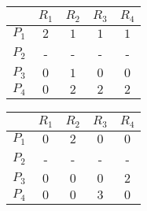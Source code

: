 \begin{example}
	\begin{table}[!h]
		\centering
		\begin{tabular}{|c|c|c|c|c|}
			\hline
			& \textbf{$R_1$} & \textbf{$R_2$} & \textbf{$R_3$} & \textbf{$R_4$} \\
			\hline
			\textbf{$P_1$} & $2$ & $1$ & $1$ & $1$ \\
			\hline
			\textbf{$P_2$} & - & - & - & - \\
			\hline
			\textbf{$P_3$} & $0$ & $1$ & $0$ & $0$ \\
			\hline
			\textbf{$P_4$} & $0$ & $2$ & $2$ & $2$ \\
			\hline
		\end{tabular}\quad
		\begin{tabular}{|c|c|c|c|c|}
		\hline
		& \textbf{$R_1$} & \textbf{$R_2$} & \textbf{$R_3$} & \textbf{$R_4$} \\
		\hline
		\textbf{$P_1$} & $0$ & $2$ & $0$ & $0$ \\
		\hline
		\textbf{$P_2$} & - & - & - & - \\
		\hline
		\textbf{$P_3$} & $0$ & $0$ & $0$ & $2$ \\
		\hline
		\textbf{$P_4$} & $0$ & $0$ & $3$ & $0$ \\
		\hline
		\end{tabular}
	\end{table}
\end{example}

